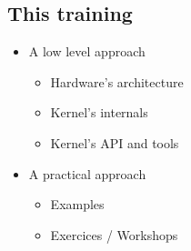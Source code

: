 \subsection*{This training}
\begin{frame}
  \begin{itemize}
  \item A low level approach
    \begin{itemize}
    \item Hardware's architecture
    \item Kernel's internals
    \item Kernel's API and tools
    \end{itemize}
  \item A practical approach
    \begin{itemize}
    \item Examples
    \item Exercices / Workshops
    \end{itemize}
  \end{itemize}
\end{frame}
